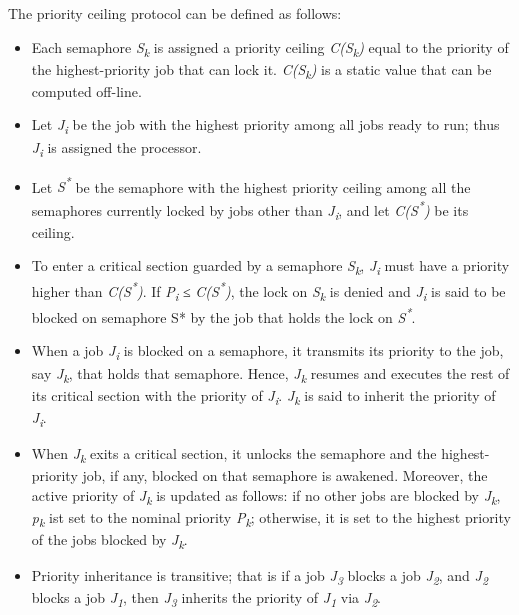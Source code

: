 The priority ceiling protocol can be defined as follows:

\begin{itemize}
\item
  Each semaphore \emph{S\textsubscript{k}} is assigned a priority
  ceiling \emph{C(S\textsubscript{k})} equal to the priority of the
  highest-priority job that can lock it. \emph{C(S\textsubscript{k})} is
  a static value that can be computed off-line.
\item
  Let \emph{J\textsubscript{i}} be the job with the highest priority
  among all jobs ready to run; thus \emph{J\textsubscript{i}} is
  assigned the processor.
\item
  Let \emph{S\textsuperscript{*}} be the semaphore with the highest
  priority ceiling among all the semaphores currently locked by jobs
  other than \emph{J\textsubscript{i}}, and let
  \emph{C(S\textsuperscript{*})} be its ceiling.
\item
  To enter a critical section guarded by a semaphore
  \emph{S\textsubscript{k}}, \emph{J\textsubscript{i}} must have a
  priority higher than \emph{C(S\textsuperscript{*})}. If
  \emph{P\textsubscript{i}} ≤ \emph{C(S\textsuperscript{*})}, the lock
  on \emph{S\textsubscript{k}} is denied and \emph{J\textsubscript{i}}
  is said to be blocked on semaphore S* by the job that holds the lock
  on \emph{S\textsuperscript{*}}.
\item
  When a job \emph{J\textsubscript{i}} is blocked on a semaphore, it
  transmits its priority to the job, say \emph{J\textsubscript{k}}, that
  holds that semaphore. Hence, \emph{J\textsubscript{k}} resumes and
  executes the rest of its critical section with the priority of
  \emph{J\textsubscript{i}}. \emph{J\textsubscript{k}} is said to
  inherit the priority of \emph{J\textsubscript{i}}.
\item
  When \emph{J\textsubscript{k}} exits a critical section, it unlocks
  the semaphore and the highest-priority job, if any, blocked on that
  semaphore is awakened. Moreover, the active priority of
  \emph{J\textsubscript{k}} is updated as follows: if no other jobs are
  blocked by \emph{J\textsubscript{k}}, \emph{p\textsubscript{k}} ist
  set to the nominal priority \emph{P\textsubscript{k}}; otherwise, it
  is set to the highest priority of the jobs blocked by
  \emph{J\textsubscript{k}}.
\item
  Priority inheritance is transitive; that is if a job
  \emph{J\textsubscript{3}} blocks a job \emph{J\textsubscript{2}}, and
  \emph{J\textsubscript{2}} blocks a job \emph{J\textsubscript{1}}, then
  \emph{J\textsubscript{3}} inherits the priority of
  \emph{J\textsubscript{1}} via \emph{J\textsubscript{2}}.
\end{itemize}

